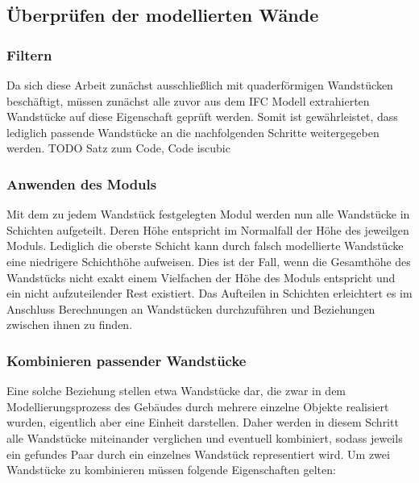 \subsection{Überprüfen der modellierten Wände}
\subsubsection{Filtern}
Da sich diese Arbeit zunächst ausschließlich mit quaderförmigen Wandstücken beschäftigt, müssen zunächst alle zuvor aus dem IFC Modell extrahierten Wandstücke auf diese Eigenschaft geprüft werden.
Somit ist gewährleistet, dass lediglich passende Wandstücke an die nachfolgenden Schritte weitergegeben werden.
TODO Satz zum Code, Code iscubic

\subsubsection{Anwenden des Moduls}
Mit dem zu jedem Wandstück festgelegten Modul werden nun alle Wandstücke in Schichten aufgeteilt.
Deren Höhe entspricht im Normalfall der Höhe des jeweilgen Moduls.
Lediglich die oberste Schicht kann durch falsch modellierte Wandstücke eine niedrigere Schichthöhe aufweisen.
Dies ist der Fall, wenn die Gesamthöhe des Wandstücks nicht exakt einem Vielfachen der Höhe des Moduls entspricht und ein nicht aufzuteilender Rest existiert.
Das Aufteilen in Schichten erleichtert es im Anschluss Berechnungen an Wandstücken durchzuführen und Beziehungen zwischen ihnen zu finden.

\subsubsection{Kombinieren passender Wandstücke}
Eine solche Beziehung stellen etwa Wandstücke dar, die zwar in dem Modellierungsprozess des Gebäudes durch mehrere einzelne Objekte realisiert wurden, eigentlich aber eine Einheit darstellen.
Daher werden in diesem Schritt alle Wandstücke miteinander verglichen und eventuell kombiniert, sodass jeweils ein gefundes Paar durch ein einzelnes Wandstück representiert wird.
Um zwei Wandstücke zu kombinieren müssen folgende Eigenschaften gelten:

